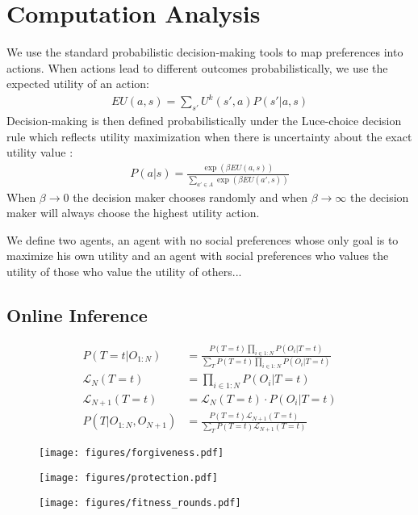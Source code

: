 \documentclass[doc, natbib]{apa6}
\theoremstyle{definition}
\begin{document}
\section{Computation Analysis}
We use the standard probabilistic decision-making tools to map preferences into actions. When actions lead to different outcomes probabilistically, we use the expected utility of an action:
\begin{align*}
  EU(a,s) = \sum_{s'} U^k(s',a)P(s'|a, s)
\end{align*}
Decision-making is then defined probabilistically under the Luce-choice decision rule which reflects utility maximization when there is uncertainty about the exact utility value \cite{luce1959individual}:
%
\begin{align}
  P(a | s) = \frac{\exp(\beta EU(a,s))}{\sum_{a' \in A} \exp(\beta EU(a',s))}
\label{softmax}
\end{align}
%
When $\beta \rightarrow 0$ the decision maker chooses randomly and when $\beta \rightarrow \infty$ the decision maker will always choose the highest utility action.

We define two agents, an agent with no social preferences whose only goal is to maximize his own utility and an agent with social preferences who values the utility of those who value the utility of others...

\subsection{Online Inference}

\begin{align}
  P(T=t | O_{1:N}) &= \frac{P(T=t)\prod_{i \in 1:N} P(O_i | T=t)}{\sum_T P(T=t)\prod_{i \in 1:N} P(O_i | T=t)} \\
  \mathcal{L}_N(T=t) &= \prod_{i \in 1:N} P(O_i | T=t) \\
  \mathcal{L}_{N+1}(T=t) &= \mathcal{L}_N(T=t) \cdot P(O_i | T=t) \\
  P(T | O_{1:N}, O_{N+1}) &= \frac{P(T=t)\mathcal{L}_{N+1}(T=t)}{\sum_T P(T=t)\mathcal{L}_{N+1}(T=t)}
\end{align}

\begin{figure}[ht]
  \centering
  \texttt{[image: figures/forgiveness.pdf]}
  \caption{\label{fig:forgiveness} }
\end{figure}

\begin{figure}[ht]
  \centering
  \texttt{[image: figures/protection.pdf]}
  \caption{\label{fig:forgiveness} }
\end{figure}


\begin{figure}[ht]
  \centering
  \texttt{[image: figures/fitness\_rounds.pdf]}
  \caption{\label{fig:forgiveness} }
\end{figure}




{}
\end{document}
